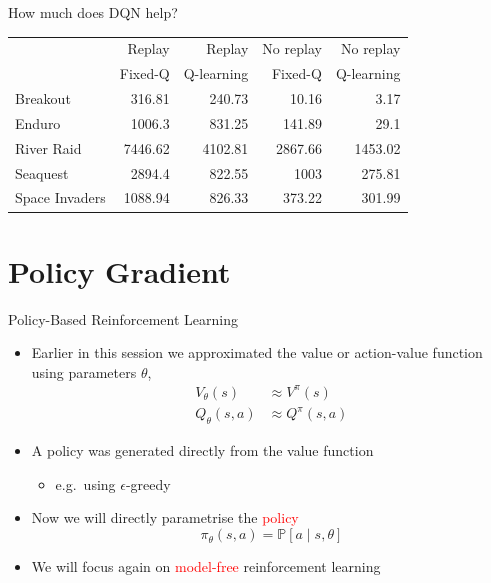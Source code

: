 \begin{frame}{How much does DQN help?}
\begin{center}
\begin{tabular}{lrrrr}
\toprule
 & Replay & Replay & No replay & No replay\\
 & Fixed-Q & Q-learning & Fixed-Q & Q-learning\\
\midrule
Breakout & 316.81 & 240.73 & 10.16 & 3.17\\
Enduro & 1006.3 & 831.25 & 141.89 & 29.1\\
River Raid & 7446.62 & 4102.81 & 2867.66 & 1453.02\\
Seaquest & 2894.4 & 822.55 & 1003 & 275.81\\
Space Invaders & 1088.94 & 826.33 & 373.22 & 301.99\\
\bottomrule
\end{tabular}
\end{center}
\end{frame}

\section{Policy Gradient}

\begin{frame}{Policy-Based Reinforcement Learning}
\begin{itemize}
  \item Earlier in this session we approximated the value or action-value function using parameters $\theta$,
  \begin{align*}
  V_\theta(s) &\approx V^\pi(s)\\
  Q_\theta(s, a) &\approx Q^\pi(s, a)
  \end{align*}
  \item A policy was generated directly from the value function
  \begin{itemize}
    \item e.g.\ using $\epsilon$-greedy
  \end{itemize}
  \item Now we will directly parametrise the \textcolor{red}{policy}
  \[ \pi_\theta(s, a) = \mathbb{P}[a \mid s, \theta] \]
  \item We will focus again on \textcolor{red}{model-free} reinforcement learning
\end{itemize}
\end{frame}

